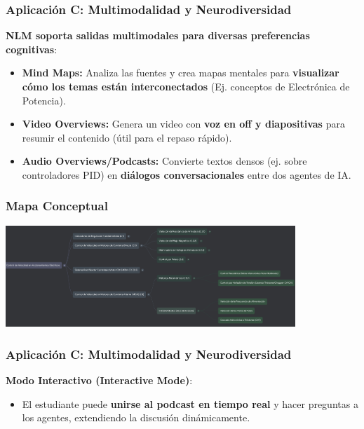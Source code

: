 \documentclass[aspectratio=43]{beamer}
\begin{document}
\begin{frame}
\frametitle{ Aplicación C: Multimodalidad y Neurodiversidad}

\textbf{NLM soporta salidas multimodales para diversas preferencias cognitivas}:
\begin{itemize}
    \item \textbf{Mind Maps:} Analiza las fuentes y crea mapas mentales para \textbf{visualizar cómo los temas están interconectados} (Ej. conceptos de Electrónica de Potencia).
    \item \textbf{Video Overviews:} Genera un video con \textbf{voz en off y diapositivas} para resumir el contenido (útil para el repaso rápido).
    \item \textbf{Audio Overviews/Podcasts:} Convierte textos densos (ej. sobre controladores PID) en \textbf{diálogos conversacionales} entre dos agentes de IA.
\end{itemize}
\end{frame}

\begin{frame}
  \frametitle{Mapa Conceptual}
  \begin{left}
    \includegraphics[width=4.3in]{mindmap.png}
  \end{left}
\end{frame}

\begin{frame}
\frametitle{ Aplicación C: Multimodalidad y Neurodiversidad}

\textbf{Modo Interactivo (Interactive Mode)}:
\begin{itemize}
    \item El estudiante puede \textbf{unirse al podcast en tiempo real} y hacer preguntas a los agentes, extendiendo la discusión dinámicamente.
\end{itemize}
\end{frame}
\end{document}
